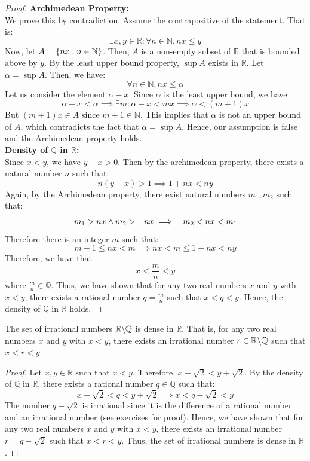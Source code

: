\documentclass[openany]{book}
\begin{document}
\begin{proof}
\textbf{Archimedean Property:} \\
We prove this by contradiction. Assume the contrapositive of the statement. That is: 
$$\exists x, y \in \mathbb{R}: \forall n \in \mathbb{N}, nx \leq y$$
Now, let $A = \{nx: n \in \mathbb{N}\}$. Then, $A$ is a non-empty subset of $\mathbb{R}$ that is bounded above by $y$. By the least upper bound property, $\sup A$ exists in $\mathbb{R}$. Let $\alpha = \sup A$. Then, we have:
$$\forall n \in \mathbb{N}, nx \leq \alpha$$ 
Let us consider the element $\alpha - x$. Since $\alpha$ is the least upper bound, we have:
$$\alpha - x < \alpha \implies \exists m: \alpha - x < mx \implies \alpha < (m+1)x$$
But $(m+1)x \in A$ since $m+1 \in \mathbb{N}$. This implies that $\alpha$ is not an upper bound of $A$, which contradicts the fact that $\alpha = \sup A$. Hence, our assumption is false and the Archimedean property holds. \\
\textbf{Density of $\mathbb{Q}$ in $\mathbb{R}$:} \\
Since $x < y$, we have $y - x >0$. Then by the archimedean property, there exists a natural number $n$ such that:
$$n(y - x) > 1 \implies 1 + nx < ny$$
Again, by the Archimedean property, there exist natural numbers $m_1, m_2$ such that:
$$m_1 > nx \wedge m_2 > -nx \implies -m_2 < nx < m_1$$
Therefore there is an integer $m$ such that: 
$$m-1 \leq nx < m \implies nx < m \leq 1 + nx < ny$$
Therefore, we have that $$x < \frac{m}{n} < y$$
where $\frac{m}{n} \in \mathbb{Q}$. Thus, we have shown that for any two real numbers $x$ and $y$ with $x < y$, there exists a rational number $q = \frac{m}{n}$ such that $x < q < y$. Hence, the density of $\mathbb{Q}$ in $\mathbb{R}$ holds.
\end{proof}
\begin{mytheorem}
The set of irrational numbers $\mathbb{R} \backslash \mathbb{Q}$ is dense in $\mathbb{R}$. That is, for any two real numbers $x$ and $y$ with $x < y$, there exists an irrational number $r \in \mathbb{R} \backslash \mathbb{Q}$ such that $x < r < y$.
\end{mytheorem}
\begin{proof}
Let $x, y \in \mathbb{R}$ such that $x < y$. Therefore, $x + \sqrt{2} < y + \sqrt{2}$. By the density of $\mathbb{Q}$ in $\mathbb{R}$, there exists a rational number $q \in \mathbb{Q}$ such that: 
$$x + \sqrt{2} < q < y + \sqrt{2} \implies x < q - \sqrt{2} < y$$
The number $q - \sqrt{2}$ is irrational since it is the difference of a rational number and an irrational number (see exercises for proof). Hence, we have shown that for any two real numbers $x$ and $y$ with $x < y$, there exists an irrational number $r = q - \sqrt{2}$ such that $x < r < y$. Thus, the set of irrational numbers is dense in $\mathbb{R}$.
\end{proof} 
\end{document}
